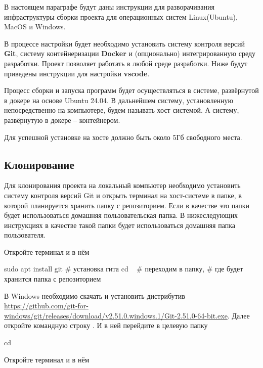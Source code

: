 В настоящем параграфе будут даны инструкции для разворачивания инфраструктуры сборки проекта
для операционных систем Linux(Ubuntu), MacOS и Windows.

В процессе настройки будет необходимо установить систему контроля версий {\bf Git},
систему контейнеризации {\bf Docker} и (опционально) интегрированную среду разработки.
Проект позволяет работать в любой среде разработки.
Ниже будут приведены инструкции для настройки {\bf vscode}.

Процесс сборки и запуска программ будет осуществляться в системе, развёрнутой в докере на основе Ubuntu 24.04.
В дальнейшем систему, установленную непосредственно на компьютере, будем называть хост системой.
А систему, развёрнутую в докере -- контейнером.

Для успешной установке на хосте должно быть около 5Гб свободного места.

\subsection{Клонирование}
Для клонирования проекта на локальный компьютер необходимо установить систему контроля версий Git
и открыть терминал на хост-системе в папке, в которой планируется хранить папку с репозиторием.
Если в качестве это папки будет использоваться домашняя пользовательская папка.
В нижеследующих инструкциях в качестве такой папки будет использоваться домашняя папка пользователя.

\begin{center}

\begin{tcolorbox}[osstyle, title=Ubuntu]
Откройте терминал и в нём
\begin{shelloutput}
sudo apt install git  # установка гита
cd ~                  # переходим в папку,
                      # где будет хранится папка с репозиторием
\end{shelloutput}
\end{tcolorbox}

\begin{tcolorbox}[osstyle, title=Windows]
В Windows необходимо скачать и установить дистрибутив
\url{https://github.com/git-for-windows/git/releases/download/v2.51.0.windows.1/Git-2.51.0-64-bit.exe}.
Далее откройте командную строку . И в ней перейдите в целевую папку
\begin{shelloutput}
cd %
\end{shelloutput}
\end{tcolorbox}

\begin{tcolorbox}[osstyle, title=MacOs]
Откройте терминал и в нём
\end{tcolorbox}

\end{center}

